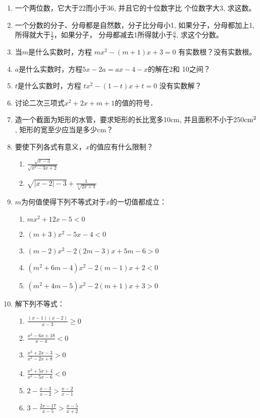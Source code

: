\begin{enumerate}
\item 一个两位数，它大于22而小于36, 并且它的十位数字比
个位数字大3, 求这数。
\item 一个分数的分子、分母都是自然数，分子比分母小1,
如果分子，分母都加上1, 所得就大于$\frac{1}{2}$，如果分子，
分母都减去1所得就小于$\frac{6}{7}$, 求这个分数。
\item 当$m$是什么实数时，方程
$mx^2-(m+1)x+3=0$
有实数根？没有实数根。
\item $a$是什么实数时，方程$5x-2a=ax-4-x$的解在2和
10之间？
\item $t$是什么实数时，方程
$tx^2-(1-t)x+t=0$
没有实数解？
\item 讨论二次三项式$x^2+2x+m+1$的值的符号．
\item 造一个截面为矩形的水管，要求矩形的长比宽多10cm, 
并且面积不小于250${\rm cm}^2$, 矩形的宽至少应当是多少cm？
\item 要使下列各式有意义，$x$的值应有什么限制？
\begin{enumerate}
    \item $\frac{\sqrt{x-3}}{\sqrt{x^2-3x+2}}$
    \item $\sqrt{|x-2|-3}+\frac{1}{\sqrt[3]{2x+1}}$
\end{enumerate}
\item $m$为何值使得下列不等式对于$x$的一切值都成立：
\begin{enumerate}
    \item $mx^2+12x-5<0$
    \item $(m+3)x^2-5x-4<0$
    \item $(m-2)x^2-2(2m-3)x+5m-6>0$
    \item $(m^2+6m-4)x^2-2(m-1)x+2<0$
    \item $(m^2+4m-5)x^2-2(m+1)x+3>0$
\end{enumerate}

\item 解下列不等式：
\begin{multicols}{2}
\begin{enumerate}
    \item $\frac{(x-1)(x-2)}{x-3}\ge 0$
    \item $\frac{x^2-6x+18}{x-4}<0$
    \item $\frac{x^2+2x-3}{x^2-2x+8}>0$
    \item $\frac{x^2+5x+4}{x^2-5x-6}<0$
    \item $2-\frac{x-3}{x-2}>\frac{x-2}{x-1}$
    \item $3-\frac{2x-17}{x-5}>\frac{x-5}{x+2}$
\end{enumerate}
\end{multicols}

\end{enumerate}







